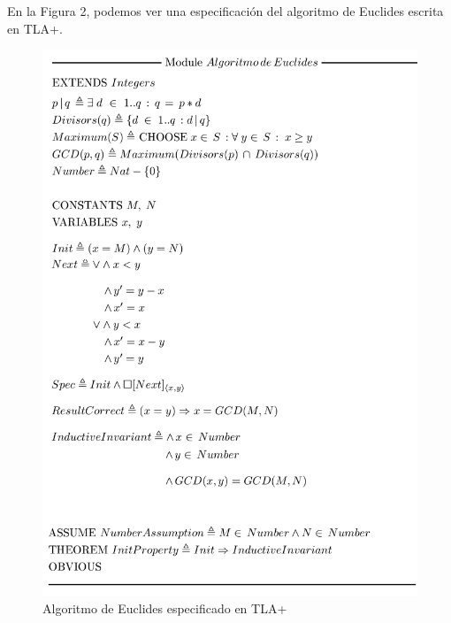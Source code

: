 \documentclass[spanish]{llncs}
\begin{document}
En la Figura 2, podemos ver una especificación del algoritmo de Euclides escrita en TLA+.
  \begin{figure}
    \includegraphics[scale=0.27]{euclid}
    \caption{Algoritmo de Euclides especificado en TLA+}   
  \end{figure}
\end{document}
